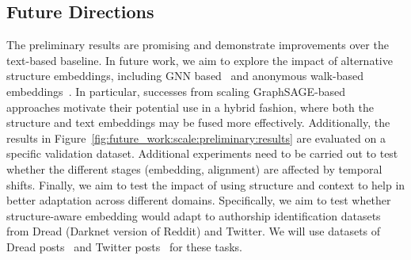 \subsection{Future Directions}
The preliminary results are promising and demonstrate improvements over the text-based baseline.
In future work, we aim to explore the impact of alternative structure embeddings, including GNN based~\cite{velivckovic2018graph,hamilton2017inductive} and anonymous walk-based embeddings~\citep{ivanov2018anonymous,wang2020inductive}.
In particular, successes from scaling GraphSAGE-based~\cite{hamilton2017inductive,ying2018graph} approaches motivate their potential use in a hybrid fashion, where both the structure and text embeddings may be fused more effectively.
Additionally, the results in Figure~\ref{fig:future_work:scale:preliminary:results} are evaluated on a specific validation dataset.
Additional experiments need to be carried out to test whether the different stages (embedding, alignment) are affected by temporal shifts.
Finally, we aim to test the impact of using structure and context to help in better adaptation across different domains.
Specifically, we aim to test whether structure-aware embedding would adapt to authorship identification datasets from Dread (Darknet version of Reddit) and Twitter.
We will use datasets of Dread posts~\cite{pastrana2018crimebb} and Twitter posts~\cite{andrews2019learning} for these tasks.
%
